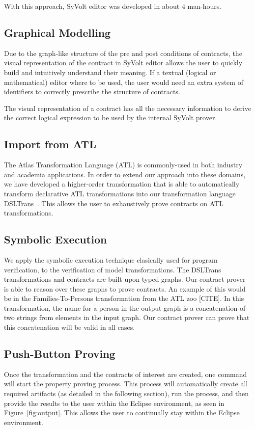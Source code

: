 With this approach, SyVolt editor was developed in about 4 man-hours.

\subsection{Graphical Modelling}

Due to the graph-like structure of the pre and post conditions of contracts, the
visual representation of the contract in SyVolt editor allows the user to
quickly build and intuitively understand their meaning.
If a textual (logical or mathematical) editor where to be used, the user would
need an extra system of identifiers to correctly prescribe the structure of contracts.

The visual representation of a contract has all the necessary information to derive the correct 
logical expression to be used by the internal SyVolt prover.

\subsection{Import from ATL}
The Atlas Transformation Language (ATL) is commonly-used in both industry and
academia applications. In order to extend our approach into these domains, we
have developed a higher-order transformation that is able to automatically
transform declarative ATL transformations into our transformation language
DSLTrans~\cite{Oakes}. This allows the user to exhaustively prove contracts on
ATL transformations.

\subsection{Symbolic Execution}
We apply the symbolic execution technique clasically used for program
verification, to the verification of model transformations. The DSLTrans
transformations and contracts are built upon typed graphs.
Our contract prover is able to reason over these graphs to prove contracts. An
example of this would be in the Families-To-Persons transformation from the ATL
zoo [CITE]. In this transformation, the name for a person in the output graph is
a concatenation of two strings from elements in the input graph. Our contract
prover can prove that this concatenation will be valid in all cases.

\subsection{Push-Button Proving}
Once the transformation and the contracts of interest are created, one command
will start the property proving process. This process will automatically create
all required artifacts (as detailed in the following section), run the process,
and then provide the results to the user within the Eclipse environment, as seen
in Figure~\ref{fig:output}. This allows the user to continually stay within the
Eclipse environment.

